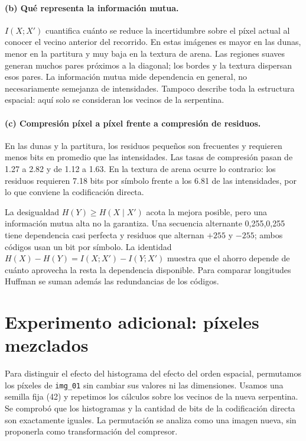 \documentclass[11pt,a4paper]{article}
\newcommand{\MI}{I(X;X')}
\newcommand{\img}[1]{\texttt{img\_#1}}
\begin{document}
\paragraph{(b) Qué representa la información mutua.}
$\MI$ cuantifica cuánto se reduce la incertidumbre sobre el píxel actual al conocer el vecino
anterior del recorrido. En estas imágenes es mayor en las dunas, menor en la partitura y muy baja
en la textura de arena. Las regiones suaves generan muchos pares próximos a la diagonal; los
bordes y la textura dispersan esos pares. La información mutua mide dependencia en general, no
necesariamente semejanza de intensidades. Tampoco describe toda la estructura espacial: aquí solo
se consideran los vecinos de la serpentina.

\paragraph{(c) Compresión píxel a píxel frente a compresión de residuos.}
En las dunas y la partitura, los residuos pequeños son frecuentes y requieren menos bits en
promedio que las intensidades. Las tasas de compresión pasan de 1.27 a 2.82 y de 1.12 a 1.63.
En la textura de arena ocurre lo contrario: los residuos requieren 7.18 bits por símbolo frente
a los 6.81 de las intensidades, por lo que conviene la codificación directa.

La desigualdad $H(Y)\ge H(X\mid X')$ acota la mejora posible, pero una información mutua alta no
la garantiza. Una secuencia alternante 0,255,0,255 tiene dependencia casi perfecta y residuos que
alternan $+255$ y $-255$; ambos códigos usan un bit por símbolo. La identidad
$H(X)-H(Y)=\MI-I(Y;X')$ muestra que el ahorro depende de cuánto aprovecha la resta la dependencia
disponible. Para comparar longitudes Huffman se suman además las redundancias de los códigos.

\section{Experimento adicional: píxeles mezclados}
Para distinguir el efecto del histograma del efecto del orden espacial, permutamos los píxeles de
\img{01} sin cambiar sus valores ni las dimensiones. Usamos una semilla fija (42) y repetimos los
cálculos sobre los vecinos de la nueva serpentina. Se comprobó que los histogramas y la cantidad de
bits de la codificación directa son exactamente iguales. La permutación se analiza como una imagen
nueva, sin proponerla como transformación del compresor.
\end{document}

